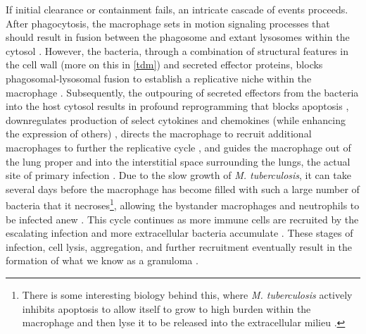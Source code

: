 If initial clearance or containment fails, an intricate cascade of events proceeds. After phagocytosis, the macrophage sets in motion signaling processes that should result in fusion between the phagosome and extant lysosomes within the cytosol \citep{Abramovitch2011}. However, the bacteria, through a combination of structural features in the cell wall (more on this in \autoref{tdm}) and secreted effector proteins, blocks phagosomal\hyp{}lysosomal fusion to establish a replicative niche within the macrophage \citep{McDonough1993, Pieters2008, Casonato2014}. Subsequently, the outpouring of secreted effectors from the bacteria into the host cytosol results in profound reprogramming that blocks apoptosis \citep{Ahluwalia2017, Keane1997, Keane2000, Maueroder2016, Yokobori2012, Beckham2017, Wong2017a}, downregulates production of select cytokines and chemokines (while enhancing the expression of others) \citep{Cambier2014a, Fortune2004, MadanLala2011}, directs the macrophage to recruit additional macrophages to further the replicative cycle \citep{Appelberg2015, Pagan2015, Cambier2014b}, and guides the macrophage out of the lung proper and into the interstitial space surrounding the lungs, the actual site of primary infection \citep{Peters2003, Upadhyay2018, Ramakrishnan2012, Cohen2018}. Due to the slow growth of \textit{M. tuberculosis}, it can take several days before the macrophage has become filled with such a large number of bacteria that it necroses\footnote{There is some interesting biology behind this, where \textit{M. tuberculosis} actively inhibits apoptosis to allow itself to grow to high burden within the macrophage and then lyse it to be released into the extracellular milieu \citep{Keane2000}.}, allowing the bystander macrophages and neutrophils to be infected anew \citep{BanosMateos2017}. This cycle continues as more immune cells are recruited by the escalating infection and more extracellular bacteria accumulate \citep{Cadena2016, Lin2006a, Corleis2020, Orme2014a}. These stages of infection, cell lysis, aggregation, and further recruitment eventually result in the formation of what we know as a granuloma \citep{Ramakrishnan2012, Pagan2018}. 

